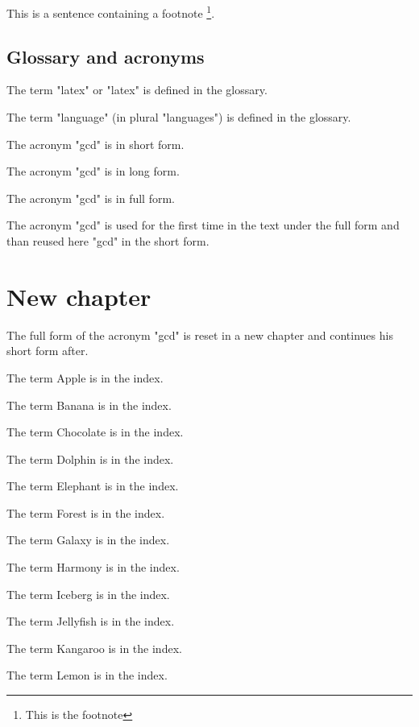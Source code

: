 This is a sentence containing a footnote \footnote{This is the footnote}.

\newpage


\section{Glossary and acronyms}

The term "\Gls{latex}" or "\gls{latex}" is defined in the glossary.

The term "\gls{language}" (in plural "\glspl{language}") is defined in the glossary.

The acronym "\acrshort{gcd}" is in short form.

The acronym "\acrlong{gcd}" is in long form.

The acronym "\acrfull{gcd}" is in full form.

The acronym "\gls{gcd}" is used for the first time in the text under the full form and than reused here "\gls{gcd}" in the short form.

\chapter*{New chapter}

The full form of the acronym "\gls{gcd}" is reset in a new chapter and continues his short form after.

\newpage

The term Apple  is in the index.

The term Banana  is in the index.

The term Chocolate  is in the index.

The term Dolphin  is in the index.

The term Elephant  is in the index.

The term Forest  is in the index.

The term Galaxy  is in the index.

The term Harmony  is in the index.

The term Iceberg  is in the index.

The term Jellyfish  is in the index.

The term Kangaroo  is in the index.

The term Lemon  is in the index.

